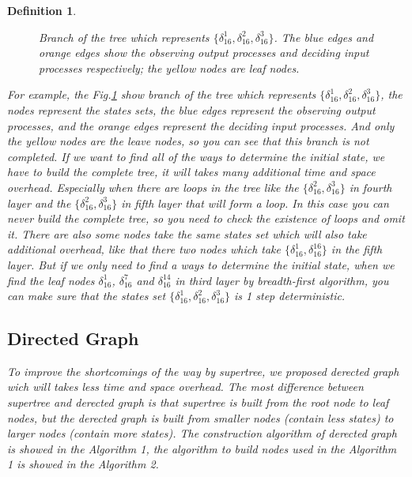 \documentclass[conference]{IEEEtran} %
\newtheorem{definition}{Definition}
\begin{document}
\begin{definition}
\begin{figure}[thpb]
      \caption{Branch of the tree which represents $\{\delta_{16}^1,\delta_{16}^2,\delta_{16}^3\}$. The blue edges and orange edges show the observing output processes and deciding input processes respectively; the yellow nodes are leaf nodes.}
      \label{fig:3}
   \end{figure}

For example, the {\em Fig.\ref{fig:3}} show branch of the tree which represents $\{\delta_{16}^1,\delta_{16}^2,\delta_{16}^3\}$, the nodes represent the states sets, the blue edges represent the observing output processes, and the orange edges represent the deciding input processes. And only the yellow nodes are the leave nodes, so you can see that this branch is not completed. If we want to find all of the ways to determine the initial state, we have to build the complete tree, it will takes many additional time and space overhead. Especially when there are loops in the tree like the $\{\delta_{16}^2,\delta_{16}^3\}$ in fourth layer and the $\{\delta_{16}^2,\delta_{16}^3\}$ in fifth layer that will form a loop. In this case you can never build the complete tree, so you need to check the existence of loops and omit it. There are also some nodes take the same states set which will also take additional overhead, like that there two nodes which take $\{\delta_{16}^1,\delta_{16}^{16}\}$ in the fifth layer. But if we only need to find a ways to determine the initial state, when we find the leaf nodes $\delta_{16}^1$, $\delta_{16}^7$ and  $\delta_{16}^{14}$ in third layer by breadth-first algorithm, you can make sure that the states set $\{\delta_{16}^1,\delta_{16}^2,\delta_{16}^3\}$ is 1 step deterministic.  
\subsection{Directed Graph}
To improve the shortcomings of the way by supertree, we proposed derected graph wich will takes less time and space overhead. The most difference between supertree and derected graph is that supertree is built from the root node to leaf nodes, but the derected graph is built from smaller nodes (contain less states) to larger nodes (contain more states). The construction algorithm of derected graph is showed in the {\em Algorithm 1}, the algorithm to build nodes used in the {\em Algorithm 1} is showed in the {\em Algorithm 2}.


\end{definition}
\end{document}
